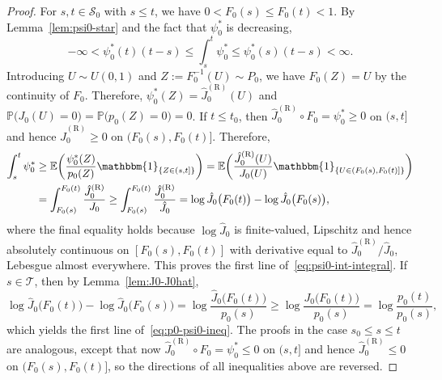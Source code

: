 \documentclass[a4paper]{article}
\newcommand{\E}{\mathbb{E}}
\renewcommand{\Pr}{\mathbb{P}}
\newcommand{\Ind}{\mathbbm{1}}
\theoremstyle{definition}
\begin{document}
\begin{proof}
For $s,t \in \mathcal{S}_0$ with $s \leq t$, we have $0 < F_0(s) \leq F_0(t) < 1$. By Lemma~\ref{lem:psi0-star} and the fact that $\psi_0^*$ is decreasing,
\[
-\infty < \psi_0^*(t)(t - s) \leq \int_s^t \psi_0^* \leq \psi_0^*(s)(t - s) < \infty.
\]
Introducing $U \sim U(0,1)$ and $Z := F_0^{-1}(U)\sim P_0$, we have $F_0(Z) = U$ by the continuity of $F_0$. Therefore, $\psi_0^*(Z) = \hat{J}_0^{(\mathrm{R})}(U)$ and $\Pr\bigl(J_0(U) = 0\bigr) = \Pr\bigl(p_0(Z) = 0\bigr) = 0$. If $t \leq t_0$, then $\hat{J}_0^{(\mathrm{R})} \circ F_0 = \psi_0^* \geq 0$ on $(s,t]$ and hence $\hat{J}_0^{(\mathrm{R})} \geq 0$ on $(F_0(s),F_0(t)]$. Therefore,
\begin{align*}
\int_s^t \psi_0^* &\geq \E\biggl(\frac{\psi_0^*(Z)}{p_0(Z)}\Ind_{\{Z \in (s,t]\}}\biggr) = \E\biggl(\frac{\hat{J}_0^{(\mathrm{R})}(U)}{J_0(U)}\Ind_{\{U \in (F_0(s),F_0(t)]\}}\biggr) \\
&= \int_{F_0(s)}^{F_0(t)} \frac{\hat{J}_0^{(\mathrm{R})}}{J_0} \geq \int_{F_0(s)}^{F_0(t)} \frac{\hat{J}_0^{(\mathrm{R})}}{\hat{J}_0}
= \log\hat{J}_0\bigl(F_0(t)\bigr) - \log\hat{J}_0\bigl(F_0(s)\bigr),
\end{align*}
where the final equality holds because $\log\hat{J}_0$ is finite-valued, Lipschitz and hence absolutely continuous on $[F_0(s),F_0(t)]$ with derivative equal to $\hat{J}_0^{(\mathrm{R})}/\hat{J}_0$, Lebesgue almost everywhere. This proves the first line of~\eqref{eq:psi0-int-integral}.  If $s \in \mathcal{T}$, then by Lemma~\ref{lem:J0-J0hat},
\[
\log\hat{J}_0\bigl(F_0(t)\bigr) - \log\hat{J}_0\bigl(F_0(s)\bigr) = \log\frac{\hat{J}_0\bigl(F_0(t)\bigr)}{p_0(s)} \geq \log\frac{J_0\bigl(F_0(t)\bigr)}{p_0(s)} = \log\frac{p_0(t)}{p_0(s)},
\]
which yields the first line of~\eqref{eq:p0-psi0-ineq}. The proofs in the case $s_0 \leq s \leq t$ are analogous, except that now $\hat{J}_0^{(\mathrm{R})} \circ F_0 = \psi_0^* \leq 0$ on $(s,t]$ and hence $\hat{J}_0^{(\mathrm{R})} \leq 0$ on $(F_0(s),F_0(t)]$, so the directions of all inequalities above are reversed.
\end{proof}
\end{document}
